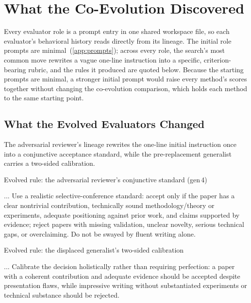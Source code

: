 \documentclass{paper}
\begin{document}
\section{What the Co-Evolution Discovered}
\label{app:evaluator-evolution}

Every evaluator role is a prompt entry in one shared workspace file, so each evaluator's behavioral history reads directly from its lineage. The initial role prompts are minimal~(\cref{app:prompts}); across every role, the search's most common move rewrites a vague one-line instruction into a specific, criterion-bearing rubric, and the rules it produced are quoted below. Because the starting prompts are minimal, a stronger initial prompt would raise every method's scores together without changing the co-evolution comparison, which holds each method to the same starting point.

\subsection{What the Evolved Evaluators Changed}
\label{app:evaluator-evolution:reviewer}

The adversarial reviewer's lineage rewrites the one-line initial instruction once into a conjunctive acceptance standard, while the pre-replacement generalist carries a two-sided calibration.

\begin{promptbox}{Evolved rule: the adversarial reviewer's conjunctive standard (gen\,4)}
\begin{PromptVerb}
... Use a realistic selective-conference standard: accept only if the
paper has a clear nontrivial contribution, technically sound
methodology/theory or experiments, adequate positioning against prior
work, and claims supported by evidence; reject papers with missing
validation, unclear novelty, serious technical gaps, or overclaiming.
Do not be swayed by fluent writing alone.
\end{PromptVerb}
\end{promptbox}

\begin{promptbox}{Evolved rule: the displaced generalist's two-sided calibration}
\begin{PromptVerb}
... Calibrate the decision holistically rather than requiring
perfection: a paper with a coherent contribution and adequate evidence
should be accepted despite presentation flaws, while impressive writing
without substantiated experiments or technical substance should be
rejected.
\end{PromptVerb}
\end{promptbox}
\end{document}
